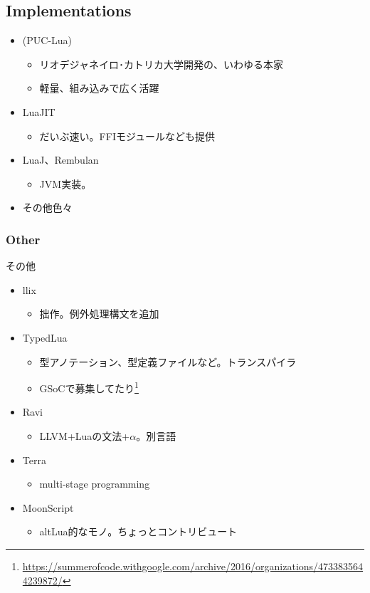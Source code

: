 \subsection{Implementations}
\begin{frame}
	\frametitlesubs
	\begin{itemize}
		\item \alert<2->{(PUC-Lua)}
			\begin{itemize}
				\item リオデジャネイロ･カトリカ大学開発の、いわゆる本家
				\item 軽量、組み込みで広く活躍
			\end{itemize}
		\item \alert<2->{LuaJIT}
			\begin{itemize}	
				\item だいぶ速い。FFIモジュールなども提供
		\end{itemize}
		\item LuaJ、Rembulan
			\begin{itemize}
				\item JVM実装。
		\end{itemize}
		\item その他色々
	\end{itemize}
\end{frame}
\subsubsection{Other}
\begin{frame}
	\frametitlesubs
	その他
	\begin{itemize}
		\item llix
			\begin{itemize}
				\item 拙作。例外処理構文を追加
			\end{itemize}
		\item TypedLua
			\begin{itemize}
				\item 型アノテーション、型定義ファイルなど。トランスパイラ
				\item GSoCで募集してたり\footnote{\url{https://summerofcode.withgoogle.com/archive/2016/organizations/4733835644239872/}}
			\end{itemize}
		\item Ravi
			\begin{itemize}
				\item LLVM+Luaの文法+$\alpha$。別言語
			\end{itemize}
		\item Terra
			\begin{itemize}
				\item multi-stage programming
			\end{itemize}
		\item MoonScript
			\begin{itemize}
				\item altLua的なモノ。\pause{}ちょっとコントリビュート
			\end{itemize}
	\end{itemize}
\end{frame}
